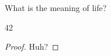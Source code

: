 \documentclass[12pt]{problem-set}
\author{Cooper Simpson}
\date{\today}
\begin{document}
	
	\maketitle
	
	\problem
		\question
			What is the meaning of life?
		
		\solution
			\begin{work}
				42
			\end{work}
			
			\begin{proof}
				Huh?
			\end{proof}
	
	
\end{document}
